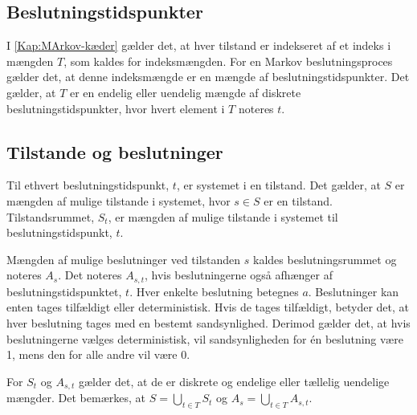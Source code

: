 

\subsection{Beslutningstidspunkter}
I \autoref{Kap:MArkov-kæder} gælder det, at hver tilstand er indekseret af et indeks i mængden $T$, som kaldes for indeksmængden. For en Markov beslutningsproces gælder det, at denne indeksmængde er en mængde af beslutningstidspunkter. Det gælder, at $T$ er en endelig eller uendelig mængde af diskrete beslutningstidspunkter, hvor hvert element i $T$ noteres $t$. 



\subsection{Tilstande og beslutninger}
Til ethvert beslutningstidspunkt, $t$, er systemet i en tilstand. Det gælder, at $S$ er mængden af mulige tilstande i systemet, hvor $s\in S$ er en tilstand. Tilstandsrummet, $S_t$, er mængden af mulige tilstande i systemet til beslutningstidspunkt, $t$. 

Mængden af mulige beslutninger ved tilstanden $s$ kaldes beslutningsrummet og noteres $A_s$. Det noteres $A_{s,t}$, hvis beslutningerne også afhænger af beslutningstidspunktet, $t$. Hver enkelte beslutning betegnes $a$. Beslutninger kan enten tages tilfældigt eller deterministisk. Hvis de tages tilfældigt, betyder det, at hver beslutning tages med en bestemt sandsynlighed. Derimod gælder det, at hvis beslutningerne vælges deterministisk, vil sandsynligheden for én beslutning være 1, mens den for alle andre vil være 0.

For $S_t$ og $A_{s,t}$ gælder det, at de er diskrete og endelige eller tællelig uendelige mængder. Det bemærkes, at $S=\displaystyle \bigcup_{t\in T}S_t$ og $A_s=\displaystyle\bigcup_{t\in T}A_{s,t}$.



